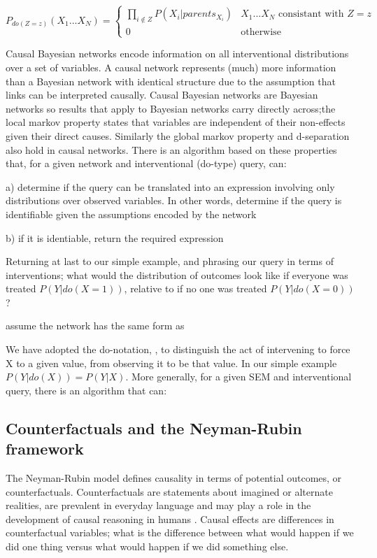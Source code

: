 \documentclass[11pt,a4paper]{article}
\begin{document}
\[
 P_{do(Z=z)}(X_{1}...X_{N}) =
  \begin{cases}
  \prod_{i \notin Z}P(X_{i}|parents_{X_{i}}) & \text{$X_{1}...X_{N}$ consistant with $Z=z$}  \\
   0       & \text{otherwise } 
  \end{cases}
\]


Causal Bayesian networks encode information on all interventional distributions over a set of variables. A causal network represents (much) more information than a Bayesian network with identical structure due to the assumption that links can be interpreted causally. Causal Bayesian networks are Bayesian networks so results that apply to Bayesian networks carry directly across;the local markov property states that variables are independent of their non-effects given their direct causes. Similarly the global markov property and d-separation also hold in causal networks. There is an algorithm \cite{Shpitser2012} based on these properties that, for a given network and interventional (do-type) query, can:

a) determine if the query can be translated into an expression involving only distributions over observed variables. In other words, determine if the query is identifiable given the assumptions encoded by the network

b) if it is identiable, return the required expression



Returning at last to our simple example, and phrasing our query in terms of interventions; what would the distribution of outcomes look like if everyone was treated $P(Y|do(X=1))$, relative to if no one was treated $P(Y|do(X=0))$? 

assume the network has the same form as 



We have adopted the do-notation, \cite{Pearl1995}, to distinguish the act of intervening to force X to a given value, from observing it to be that value. In our simple example $P(Y|do(X)) = P(Y|X)$. More generally, for a given SEM and interventional query, there is an algorithm  that can:



\subsection{Counterfactuals and the Neyman-Rubin framework}

The Neyman-Rubin model \cite{Rubin1974,Rubin1978,Rosenbaum1983, Rubin2005,Rubin2008} defines causality in terms of potential outcomes, or counterfactuals. Counterfactuals are statements about imagined or alternate realities, are prevalent in everyday language and may play a role in the development of causal reasoning in humans \cite{Weisberg2013}. Causal effects are differences in counterfactual variables; what is the difference between what would happen if we did one thing versus what would happen if we did something else. 
\end{document}
